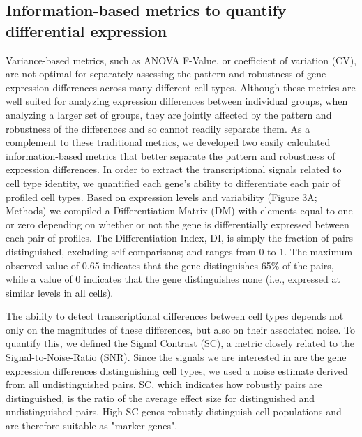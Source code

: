 \subsection{Information-based metrics to quantify differential expression}
Variance-based metrics, such as ANOVA F-Value, or coefficient of variation (CV), are not optimal for separately assessing the pattern and robustness of gene expression differences across many different cell types. Although these metrics are well suited for analyzing expression differences between individual groups, when analyzing a larger set of groups, they are jointly affected by the pattern and robustness of the differences and so cannot readily separate them. As a complement to these traditional metrics, we developed two easily calculated information-based metrics that better separate the pattern and robustness of expression differences. In order to extract the transcriptional signals related to cell type identity, we quantified each gene's ability to differentiate each pair of profiled cell types. Based on expression levels and variability (Figure 3A; Methods) we compiled a Differentiation Matrix (DM) with elements equal to one or zero depending on whether or not the gene is differentially expressed between each pair of profiles. The Differentiation Index, DI, is simply the fraction of pairs distinguished, excluding self-comparisons; and ranges from 0 to 1. The maximum observed value of 0.65 indicates that the gene distinguishes 65\% of the pairs, while a value of 0 indicates that the gene distinguishes none (i.e., expressed at similar levels in all cells). 

The ability to detect transcriptional differences between cell types depends not only on the magnitudes of these differences, but also on their associated noise. To quantify this, we defined the Signal Contrast (SC), a metric closely related to the Signal-to-Noise-Ratio (SNR). Since the signals we are interested in are the gene expression differences distinguishing cell types, we used a noise estimate derived from all undistinguished pairs. SC, which indicates how robustly pairs are distinguished, is the ratio of the average effect size for distinguished and undistinguished pairs. High SC genes robustly distinguish cell populations and are therefore suitable as "marker genes".

